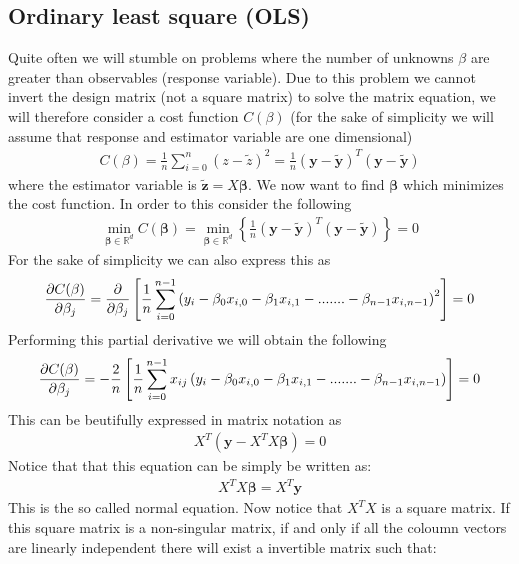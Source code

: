 \documentclass[a4paper, 10pt]{article}
\begin{document}
\subsection{Ordinary least square (OLS)}
Quite often we will stumble on problems where the number of unknowns $\beta$ are greater than observables (response variable). Due to this problem we cannot invert the design matrix (not a square matrix) to solve the matrix equation, we will therefore consider a cost function $C(\beta)$ (for the sake of simplicity we will assume that response and estimator variable are one dimensional)
\begin{align}
  C(\beta) = \frac{1}{n}\sum_{i = 0}^{n}(z-\tilde{z})^2 = \frac{1}{n}\left(\mathbf{y} - \tilde{\mathbf{y}}\right)^{T} \left(\mathbf{y} - \tilde{\mathbf{y}}\right)
  \label{cost}
\end{align}
where the estimator variable is $\mathbf{\tilde{z}} = X\boldsymbol{\beta}$. We now want to find $\boldsymbol{\beta}$ which minimizes the cost function. In order to this consider the following
\begin{align}
  \min_{\boldsymbol{\beta}\in \mathbb{R}^{d}}C(\boldsymbol{\beta}) = \min_{\boldsymbol{\beta}\in \mathbb{R}^{d}}\left\{\frac{1}{n}\left(\mathbf{y} - \tilde{\mathbf{y}}\right)^{T} \left(\mathbf{y} - \tilde{\mathbf{y}}\right)\right\} = 0
\end{align}
For the sake of simplicity we can also express this as
\begin{align}
  \pdv{C(\beta)}{\beta_{j}} =
  \pdv{\beta_{j}}\left[\frac{1}{n}\sum_{i = 0}^{n-1}\left(y_{i} - \beta_{0}x_{i,0}  - \beta_{1}x_{i,1} - .......- \beta_{n-1}x_{i,n-1}\right)^{2}\right] = 0
\end{align}
Performing this partial derivative we will obtain the following
\begin{align}
    \pdv{C(\beta)}{\beta_{j}} = - \frac{2}{n}\left[\frac{1}{n}\sum_{i = 0}^{n-1}x_{ij}\left(y_{i} - \beta_{0}x_{i,0}  - \beta_{1}x_{i,1} - .......- \beta_{n-1}x_{i,n-1}\right)\right] = 0
\end{align}
This can be beutifully expressed in matrix notation as
\begin{align}
  X^{T}\left(\mathbf{y} - X^{T}X\boldsymbol{\beta}\right) = 0
\end{align}
Notice that that this equation can be simply be written as:
\begin{align}
  X^{T}X\boldsymbol{\beta} = X^{T}\mathbf{y}
\end{align}
This is the so called normal equation. Now notice that $X^{T}X$ is a square matrix. If this square matrix is a non-singular matrix, if and only if all the coloumn vectors are linearly independent there will exist a invertible matrix such that:
\end{document}
